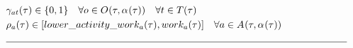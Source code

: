 \begin{alignat}{2}
	& \VarSupervisorAssignment{\ElementActivity}{\ElementTechnician} \in \{0, 1\}  \quad \forall \ElementOperation \in \SetOperation{}{\VarStrategicWorkOrderAssignment{}{}} \quad \forall \ElementTechnician \in \SetTechnician \\ 
	& \VarActivityWork{\ElementActivity} \in [\ParLowerActivityWork, \ParOperationWork{\ElementActivity}]  \quad \forall \ElementActivity \in \SetActivity{\VarStrategicWorkOrderAssignment{}{}}{}\\ 
	& \text{\rule{\linewidth}{0.4pt}} \notag
\end{alignat}
\newpage
